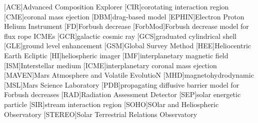 	\begin{acronym}
	[ACE]{Advanced Composition Explorer}
	[CIR]{corotating interaction region}
	[CME]{coronal mass ejection}
	[DBM]{drag-based model}
	[EPHIN]{Electron Proton Helium Instrument}
	[FD]{Forbush decrease}
	[ForbMod]{Forbush decrease model for flux rope ICMEs \cite{Dumbovic2018-ForbMod}}
	[GCR]{galactic cosmic ray}
	[GCS]{graduated cylindrical shell}
	[GLE]{ground level enhancement}
	[GSM]{Global Survey Method \cite{Belov-2005-GSM}}
	[HEE]{Heliocentric Earth Ecliptic}
	[HI]{heliospheric imager}
	[IMF]{interplanetary magnetic field}
    [ISM]{Interstellar medium}
	[ICME]{interplanetary coronal mass ejection}
	[MAVEN]{Mars Atmosphere and Volatile EvolutioN}
	[MHD]{magnetohydrodynamic}
	[MSL]{Mars Science Laboratory}
	[PDB]{propagating diffusive barrier model for Forbush decreases \cite{Wibberenz-1998}}
	[RAD]{Radiation Assessment Detector}
	[SEP]{solar energetic particle}
	[SIR]{stream interaction region}
	[SOHO]{SOlar and Heliospheric Observatory}
	[STEREO]{Solar Terrestrial Relations Observatory}
	\end{acronym}
	

\endgroup

\cleardoublepage